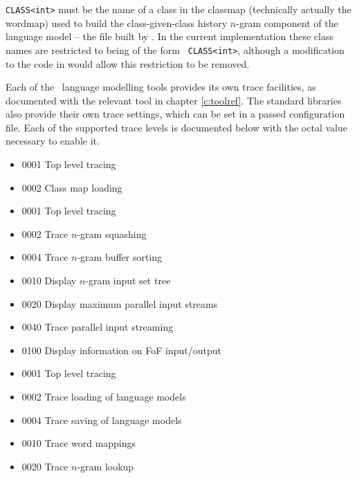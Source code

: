 {\tt CLASS<int>} must be the name of a
class in the classmap (technically actually the wordmap) used to build
the class-given-class history $n$-gram component of the language model
-- the file built by .  In the current implementation
these class names are restricted to being of the form {\tt
CLASS<int>}, although a modification to the code in 
would allow this restriction to be removed.


Each of the \HTK\ language modelling tools provides its own trace
facilities, as documented with the relevant tool in chapter
\ref{c:toolref}.  The standard libraries also provide their own trace
settings, which can be set in a passed configuration file.  Each of
the supported trace levels is documented below with the octal value
necessary to enable it.

\begin{itemize}
\item 0001       Top level tracing
\item 0002       Class map loading
\end{itemize}

\begin{itemize}
\item 0001       Top level tracing
\item 0002       Trace $n$-gram squashing
\item 0004       Trace $n$-gram buffer sorting
\item 0010       Display $n$-gram input set tree
\item 0020       Display maximum parallel input streams
\item 0040       Trace parallel input streaming
\item 0100       Display information on FoF input/output
\end{itemize}

\begin{itemize}
\item 0001       Top level tracing
\item 0002       Trace loading of language models
\item 0004       Trace saving of language models
\item 0010       Trace word mappings
\item 0020       Trace $n$-gram lookup
\end{itemize}

